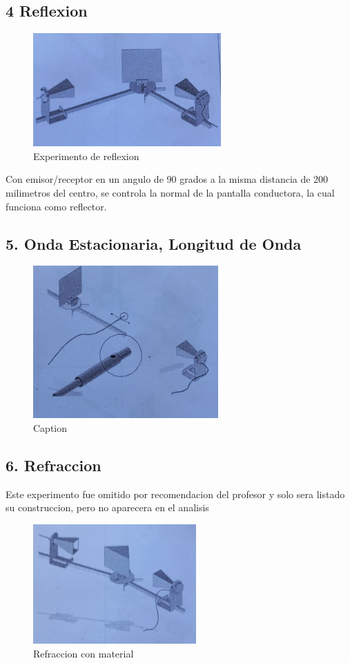 \documentclass[a4paper,twocolumn,10pt]{article}
\begin{document}
\subsection*{4 Reflexion}

\begin{figure}[H]
    \centering
    \includegraphics{MO_montaje/4.png}
    \caption{Experimento de reflexion}
    \label{fig:montreflex}
\end{figure}

Con emisor/receptor en un angulo de 90 grados a la misma distancia de 200 milimetros del centro, se controla la normal de la pantalla conductora, la cual funciona como reflector.

\subsection*{5. Onda Estacionaria, Longitud de Onda}
\begin{figure}[H]
    \centering
    \includegraphics{MO_montaje/5.png}
    \caption{Caption}
    \label{fig:my_label}
\end{figure}

\subsection*{6. Refraccion}
Este experimento fue omitido por recomendacion del profesor y solo sera listado su construccion, pero no aparecera en el analisis
\begin{figure}[H]
    \centering
    \includegraphics{MO_montaje/6.png}
    \caption{Refraccion con material}
    \label{fig:montrefr}
\end{figure}
\end{document}
